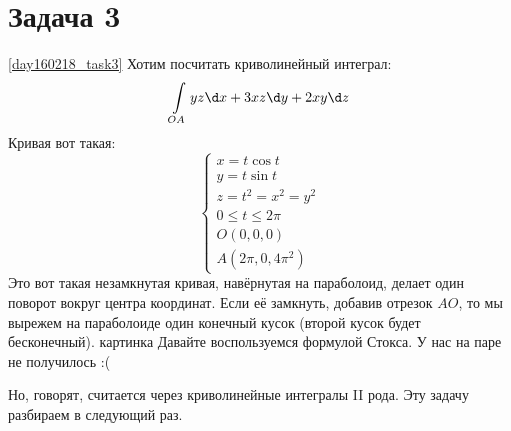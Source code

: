 \section{Задача 3}\ref{day160218_task3}
	Хотим посчитать криволинейный интеграл:
	\[
		\int\limits_{OA} y z \d x + 3 x z \d y + 2 x y \d z \\
	\]
	Кривая вот такая:
	\[
		\begin{cases}
			x = t \cos t \\
			y = t \sin t \\
			z = t^2 = x^2=y^2 \\
			0 \le t \le 2 \pi \\
			O(0, 0, 0) \\
			A(2\pi, 0, 4\pi^2)
		\end{cases}
	\]
	Это вот такая незамкнутая кривая, навёрнутая на параболоид, делает один поворот вокруг центра координат.
	Если её замкнуть, добавив отрезок $AO$, то мы вырежем на параболоиде один конечный кусок (второй кусок будет бесконечный).
	\TODO картинка
	Давайте воспользуемся формулой Стокса.
	У нас на паре не получилось :(

	Но, говорят, считается через криволинейные интегралы II рода.
	Эту задачу разбираем в следующий раз.
